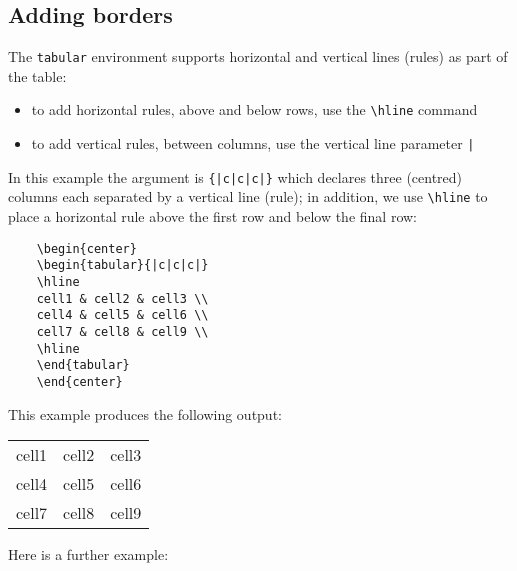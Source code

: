 \subsection{Adding borders}

The \verb|tabular| environment supports horizontal and vertical lines (rules) as part of the table:

\begin{itemize}
    \item to add horizontal rules, above and below rows, use the \verb|\hline| command
    \item to add vertical rules, between columns, use the vertical line parameter \verb+|+
\end{itemize}

In this example the argument is \verb+{|c|c|c|}+ which declares three (centred) columns each separated by a vertical line (rule); in addition, we use \verb|\hline| to place a horizontal rule above the first row and below the final row:

\begin{tcolorbox}
\begin{verbatim}
    \begin{center}
    \begin{tabular}{|c|c|c|} 
    \hline
    cell1 & cell2 & cell3 \\ 
    cell4 & cell5 & cell6 \\ 
    cell7 & cell8 & cell9 \\ 
    \hline
    \end{tabular}
    \end{center}
\end{verbatim}
\end{tcolorbox}

\newpage
This example produces the following output:

\begin{mdframed}
    \begin{center}
    \begin{tabular}{|c|c|c|} 
    \hline
    cell1 & cell2 & cell3 \\ 
    cell4 & cell5 & cell6 \\ 
    cell7 & cell8 & cell9 \\ 
    \hline
    \end{tabular}
    \end{center}
\end{mdframed}

Here is a further example:

